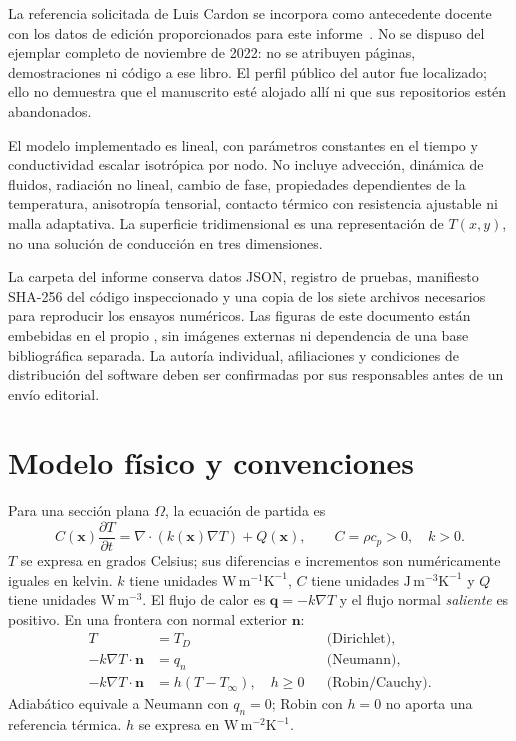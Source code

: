\documentclass[11pt,a4paper]{article}
\newcommand{\code}[1]{\texttt{\detokenize{#1}}}
\begin{document}
La referencia solicitada de Luis Cardon se incorpora como antecedente docente
con los datos de edición proporcionados para este informe~\cite{cardon}.
No se dispuso del ejemplar completo de noviembre de 2022: no se atribuyen
páginas, demostraciones ni código a ese libro. El perfil público del autor
fue localizado; ello no demuestra que el manuscrito esté alojado allí ni que
sus repositorios estén abandonados.

El modelo implementado es lineal, con parámetros constantes en el tiempo y
conductividad escalar isotrópica por nodo. No incluye advección, dinámica de
fluidos, radiación no lineal, cambio de fase, propiedades dependientes de
la temperatura, anisotropía tensorial, contacto térmico con resistencia
ajustable ni malla adaptativa. La superficie tridimensional es una
representación de $T(x,y)$, no una solución de conducción en tres dimensiones.

La carpeta del informe conserva datos JSON, registro de pruebas, manifiesto
SHA-256 del código inspeccionado y una copia de los siete archivos necesarios
para reproducir los ensayos numéricos. Las figuras de este documento están
embebidas en el propio \code{.tex}, sin imágenes externas ni dependencia de
una base bibliográfica separada. La autoría individual, afiliaciones y
condiciones de distribución del software deben ser confirmadas por sus
responsables antes de un envío editorial.

\section{Modelo físico y convenciones}
\label{sec:model}
Para una sección plana $\Omega$, la ecuación de partida es
\begin{equation}
 C(\boldsymbol{x})\frac{\partial T}{\partial t}
 =\nabla\!\cdot\!\left(k(\boldsymbol{x})\nabla T\right)+Q(\boldsymbol{x}),
 \qquad C=\rho c_p>0,\quad k>0.
 \label{eq:pde}
\end{equation}
$T$ se expresa en grados Celsius; sus diferencias e incrementos son
numéricamente iguales en kelvin. $k$ tiene unidades
$\mathrm{W\,m^{-1}K^{-1}}$, $C$ tiene unidades
$\mathrm{J\,m^{-3}K^{-1}}$ y $Q$ tiene unidades $\mathrm{W\,m^{-3}}$.
El flujo de calor es $\boldsymbol{q}=-k\nabla T$ y el flujo normal
\emph{saliente} es positivo. En una frontera con normal exterior $\boldsymbol n$:
\begin{align}
 T&=T_D &&\text{(Dirichlet)},\\
 -k\nabla T\cdot\boldsymbol n&=q_n &&\text{(Neumann)},\\
 -k\nabla T\cdot\boldsymbol n&=h(T-T_\infty),\quad h\ge0
 &&\text{(Robin/Cauchy)}.
\end{align}
Adiabático equivale a Neumann con $q_n=0$; Robin con $h=0$ no aporta una
referencia térmica. $h$ se expresa en $\mathrm{W\,m^{-2}K^{-1}}$.
\end{document}
